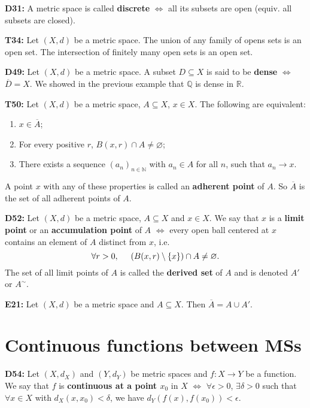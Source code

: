 \documentclass[twocolumn,10pt]{article}
\begin{document}
\textbf{D31:} A metric space is called \textbf{discrete} $\Leftrightarrow$ all its subsets are open (equiv. all subsets are closed).

\textbf{T34:} Let $(X,d)$ be a metric space. The union of any family of opens sets is an open set. The intersection of finitely many open sets is an open set.


\textbf{D49:} Let $(X,d)$ be a metric space. A subset $D\subseteq X$ is said to be \textbf{dense} $\Leftrightarrow$ $\overline{D}=X$. We showed in the previous example that $\mathbb{Q}$ is dense in $\mathbb{R}$.

\textbf{T50:} Let $(X,d)$ be a metric space, $A\subseteq X$, $x\in X$. The following are equivalent:
\begin{enumerate}
    \item $x\in\overline{A}$;
    \item For every positive $r$, $B(x,r)\cap A\neq\varnothing$;
    \item There exists a sequence $(a_n)_{n\in\mathbb{N}}$ with $a_n\in A$ for all $n$, such that $a_n\to x$.
\end{enumerate}
A point $x$ with any of these properties is called an \textbf{adherent point} of $A$. So $\overline{A}$ is the set of all adherent points of $A$.


\textbf{D52:} Let $(X,d)$ be a metric space, $A\subseteq X$ and $x\in X$. We say that $x$ is a \textbf{limit point} or an \textbf{accumulation point} of $A$ $\Leftrightarrow$ every open ball centered at $x$ contains an element of $A$ distinct from $x$, i.e.
\begin{equation*}
    \forall r>0, \hspace{0.5cm} (B(x,r) \setminus \{x\}) \cap A \neq \varnothing.
\end{equation*}
The set of all limit points of $A$ is called the \textbf{derived set} of $A$ and is denoted $A'$ or $A^{\sim}$.


\textbf{E21:} Let $(X,d)$ be a metric space and $A\subseteq X$. Then $\overline{A}=A\cup A'$.

\section{Continuous functions between MSs}

\textbf{D54:} Let $(X,d_X)$ and $(Y,d_Y)$ be metric spaces and $f:X\to Y$ be a function. We say that $f$ is \textbf{continuous at a point $x_0$} in $X$ $\Leftrightarrow$ $\forall\epsilon>0$, $\exists\delta>0$ such that $\forall x\in X$ with $d_X(x,x_0)<\delta$, we have $d_Y(f(x),f(x_0))<\epsilon$.
\end{document}

